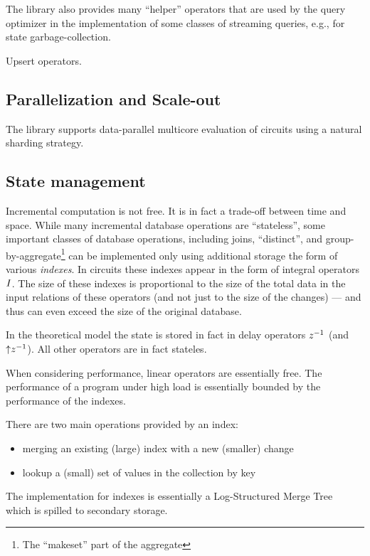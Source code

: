 The library also provides many ``helper'' operators that are used by
the query optimizer in the implementation of some classes of streaming
queries, e.g., for state garbage-collection.

Upsert operators.

\subsection{Parallelization and Scale-out}

The library supports data-parallel multicore evaluation of circuits
using a natural sharding strategy.

\subsection{State management}

Incremental computation is not free.  It is in fact a trade-off
between time and space.  While many incremental database operations
are ``stateless'', some important classes of database operations,
including joins, ``distinct'', and group-by-aggregate\footnote{The
``makeset'' part of the aggregate} can be implemented only using
additional storage the form of various \emph{indexes}.  In \dbsp
circuits these indexes appear in the form of integral operators $\mathit{I}$.
The size of these indexes is proportional to the size of the total
data in the input relations of these operators (and not just to the
size of the changes) --- and thus can even exceed the size of the
original database.

In the \dbsp theoretical model the state is stored in fact in delay
operators $z^{-1}$ (and ${\uparrow}z^{-1}$).  All other operators are in fact
stateles.

When considering performance, linear operators are essentially free.
The performance of a \dbsp program under high load is essentially
bounded by the performance of the indexes.

There are two main operations provided by an index:
\begin{itemize}
\item merging an existing (large) index with a new (smaller) change
\item lookup a (small) set of values in the collection by key
\end{itemize}

The implementation for indexes is essentially a Log-Structured Merge
Tree~\cite{oneil-ai96} which is spilled to secondary storage.

